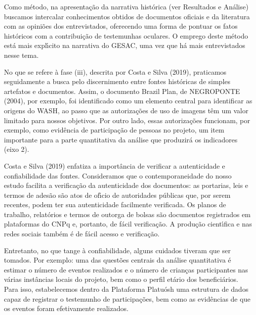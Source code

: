\documentclass[
12pt,		%
openright,	%
twoside,  %
a4paper,			%
chapter=TITLE,		%
english,			%
french,				%
spanish,			%
brazil				%
]{USPSC-classe/USPSC}
\begin{document}
Como m\'etodo, na apresenta\c{c}\~ao da narrativa hist\'orica (ver Resultados e An\'alise) buscamos intercalar conhecimentos obtidos de documentos oficiais e da literatura com as opini\~oes dos entrevistados, oferecendo uma forma de pontuar os fatos hist\'oricos com a contribui\c{c}\~ao de testemunhas oculares. O emprego deste m\'etodo est\'a mais expl\'{\i}cito na narrativa do GESAC, uma vez que h\'a mais entrevistados nesse tema.










No que se refere \`a fase (iii), descrita por  Costa e Silva (2019), praticamos seguidamente a busca pelo discernimento entre fontes hist\'oricas de simples artefatos e documentos. Assim, o documento \textquotedbl Brazil Plan\textquotedbl , de  NEGROPONTE (2004), por exemplo, foi identificado como um elemento central para identificar as origens do WASH, ao passo que as autoriza\c{c}\~oes de uso de imagens t\^em um valor limitado para nossos objetivos.  Por outro lado, essas autoriza\c{c}\~oes funcionam, por exemplo, como evid\^encia de participa\c{c}\~ao de pessoas no projeto, um item importante para a parte quantitativa da an\'alise que produzir\'a os indicadores (eixo 2).










Costa e Silva (2019) enfatiza a import\^ancia de verificar a autenticidade e confiabilidade das fontes. Consideramos que o contemporaneidade do nosso estudo facilita a verifica\c{c}\~ao da autenticidade dos documentos: as portarias, leis e termos de ades\~ao s\~ao atos de of\'{\i}cio de autoridades p\'ublicas que, por serem recentes, podem ter sua autenticidade facilmente verificada. Os planos de trabalho, relat\'orios e termos de outorga de bolsas s\~ao documentos registrados em plataformas do CNPq e, portanto, de f\'acil verifica\c{c}\~ao. A produ\c{c}\~ao cient\'{\i}fica e nas redes sociais tamb\'em \'e de f\'acil acesso e verifica\c{c}\~ao.










Entretanto, no que tange \`a confiabilidade, alguns cuidados tiveram que ser tomados. Por exemplo: uma das quest\~oes centrais da an\'alise quantitativa \'e estimar o n\'umero de eventos realizados e o n\'umero de crian\c{c}as participantes nas v\'arias inst\^ancias locais do projeto, bem como o perfil et\'ario dos benefici\'arios. Para isso, estabelecemos dentro da Plataforma Platu\'osh uma estrutura de dados capaz de registrar o testemunho de participa\c{c}\~oes, bem como as evid\^encias de que os eventos foram efetivamente realizados.
\end{document}
